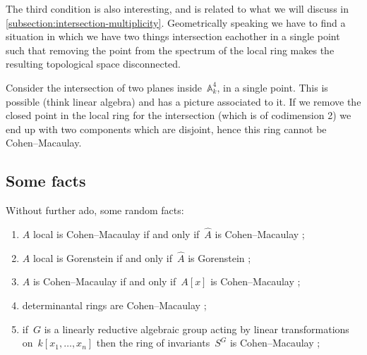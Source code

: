 \documentclass[10pt,a4paper]{article}
\begin{document}
The third condition is also interesting, and is related to what we will discuss in \cref{subsection:intersection-multiplicity}. Geometrically speaking we have to find a situation in which we have two things intersection eachother in a single point such that removing the point from the spectrum of the local ring makes the resulting topological space disconnected. 
\begin{example}
  Consider the intersection of two planes inside~$\mathbb{A}_k^4$, in a single point. This is possible (think linear algebra) and has a picture associated to it. If we remove the closed point in the local ring for the intersection (which is of codimension 2) we end up with two components which are disjoint, hence this ring cannot be Cohen--Macaulay.
\end{example}

\subsection{Some facts}
\label{subsections:facts}
Without further ado, some random facts:
\begin{enumerate}
  \item $A$ local is Cohen--Macaulay if and only if~$\hat{A}$ is Cohen--Macaulay \cite[proposition 18.8]{eisenbud-commutative-algebra};
  \item $A$ local is Gorenstein if and only if~$\hat{A}$ is Gorenstein \cite[proposition 21.18]{eisenbud-commutative-algebra};
  \item $A$ is Cohen--Macaulay if and only if~$A[x]$ is Cohen--Macaulay \cite[proposition 18.9]{eisenbud-commutative-algebra};
  \item determinantal rings are Cohen--Macaulay \cite[theorem 18.18]{eisenbud-commutative-algebra};
  \item if~$G$ is a linearly reductive algebraic group acting by linear transformations on~$k[x_1,\dotsc,x_n]$ then the ring of invariants~$S^G$ is Cohen--Macaulay \cite[\S 18.5]{eisenbud-commutative-algebra};
\end{enumerate}
\end{document}

